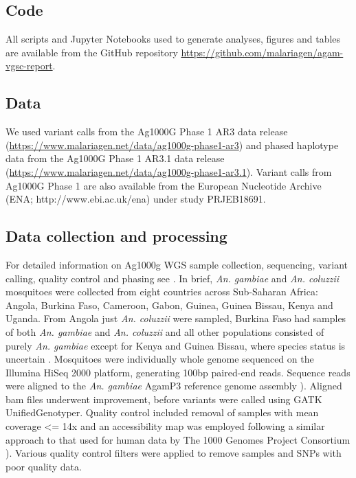 \documentclass[a4paper,11pt,abstracton,hidelinks]{scrartcl}
\begin{document}
\subsection*{Code}

%
All scripts and Jupyter Notebooks used to generate analyses, figures and tables are available from the GitHub repository \url{https://github.com/malariagen/agam-vgsc-report}. 


\subsection*{Data}

%
We used variant calls from the Ag1000G Phase 1 AR3 data release (\url{https://www.malariagen.net/data/ag1000g-phase1-ar3}) and phased haplotype data from the Ag1000G Phase 1 AR3.1 data release (\url{https://www.malariagen.net/data/ag1000g-phase1-ar3.1}).
%
Variant calls from Ag1000G Phase 1 are also available from the European Nucleotide Archive (ENA; http://www.ebi.ac.uk/ena) under study PRJEB18691.


\subsection*{Data collection and processing}

%
For detailed information on Ag1000g WGS sample collection, sequencing, variant calling, quality control and phasing see \cite{Ag1000gConsortium2017}.
%
In brief, \emph{An. gambiae} and \emph{An. coluzzii} mosquitoes were collected from eight countries across Sub-Saharan Africa: Angola, Burkina Faso, Cameroon, Gabon, Guinea, Guinea Bissau, Kenya and Uganda. 
%
From Angola just \emph{An. coluzzii} were sampled, Burkina Faso had samples of both \emph{An. gambiae} and \emph{An. coluzzii} and all other populations consisted of purely \emph{An. gambiae} except for Kenya and Guinea Bissau, where species status is uncertain \cite{Ag1000gConsortium2017}.
%
Mosquitoes were individually whole genome sequenced on the Illumina HiSeq 2000 platform, generating 100bp paired-end reads. 
%
Sequence reads were aligned to the \emph{An. gambiae} AgamP3 reference genome assembly \cite{Holt2002}). 
%
Aligned bam files underwent improvement, before variants were called using GATK UnifiedGenotyper. 
%
Quality control included removal of samples with mean coverage <= 14x and an accessibility map was employed following a similar approach to that used for human data by The 1000 Genomes Project Consortium \cite{The1000GenomesProjectConsortium2010}). 
%
Various quality control filters were applied to remove samples and SNPs with poor quality data. 
\end{document}
